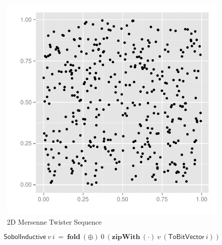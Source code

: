 \documentclass{beamer}
\begin{document}
\begin{frame}
\begin{minipage}[t]{0.48\linewidth}
  \end{minipage}
  \begin{minipage}[t]{0.48\linewidth}
    \begin{figure}
      \centering
      \includegraphics[width=\textwidth]{graphics/2D-mersenne-sequence.pdf}
      \vspace{-5mm}
      \caption{2D Mersenne Twister Sequence}
  \label{fig:2dmersenne}
\end{figure}

  \end{minipage}
  \pause
  \vspace{6mm}
  \begin{equation*}
    \mathsf{SobolInductive}~v~i~=~\textbf{fold}~(\oplus)~0~(\textbf{zipWith}~(\cdot)~v~(\textsf{ToBitVector}~i))
  \end{equation*}
\end{frame}
\end{document}
